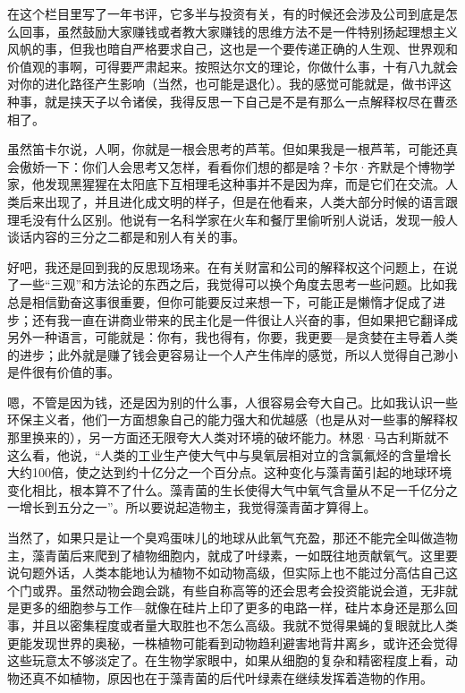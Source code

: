 在这个栏目里写了一年书评，它多半与投资有关，有的时候还会涉及公司到底是怎么回事，虽然鼓励大家赚钱或者教大家赚钱的思维方法不是一件特别扬起理想主义风帆的事，但我也暗自严格要求自己，这也是一个要传递正确的人生观、世界观和价值观的事啊，可得要严肃起来。按照达尔文的理论，你做什么事，十有八九就会对你的进化路径产生影响（当然，也可能是退化）。我的感觉可能就是，做书评这种事，就是挟天子以令诸侯，我得反思一下自己是不是有那么一点解释权尽在曹丞相了。

虽然笛卡尔说，人啊，你就是一根会思考的芦苇。但如果我是一根芦苇，可能还真会傲娇一下：你们人会思考又怎样，看看你们想的都是啥？卡尔·齐默是个博物学家，他发现黑猩猩在太阳底下互相理毛这种事并不是因为痒，而是它们在交流。人类后来出现了，并且进化成文明的样子，但是在他看来，人类大部分时候的语言跟理毛没有什么区别。他说有一名科学家在火车和餐厅里偷听别人说话，发现一般人谈话内容的三分之二都是和别人有关的事。

好吧，我还是回到我的反思现场来。在有关财富和公司的解释权这个问题上，在说了一些``三观''和方法论的东西之后，我觉得可以换个角度去思考一些问题。比如我总是相信勤奋这事很重要，但你可能要反过来想一下，可能正是懒惰才促成了进步；还有我一直在讲商业带来的民主化是一件很让人兴奋的事，但如果把它翻译成另外一种语言，可能就是：你有，我也得有，你要，我更要---是贪婪在主导着人类的进步；此外就是赚了钱会更容易让一个人产生伟岸的感觉，所以人觉得自己渺小是件很有价值的事。

嗯，不管是因为钱，还是因为别的什么事，人很容易会夸大自己。比如我认识一些环保主义者，他们一方面想象自己的能力强大和优越感（也是从对一些事的解释权那里换来的），另一方面还无限夸大人类对环境的破坏能力。林恩·马古利斯就不这么看，他说，``人类的工业生产使大气中与臭氧层相对立的含氯氟烃的含量增长大约100倍，使之达到约十亿分之一个百分点。这种变化与藻青菌引起的地球环境变化相比，根本算不了什么。藻青菌的生长使得大气中氧气含量从不足一千亿分之一增长到五分之一''。所以要说起造物主，我觉得藻青菌才算得上。

当然了，如果只是让一个臭鸡蛋味儿的地球从此氧气充盈，那还不能完全叫做造物主，藻青菌后来爬到了植物细胞内，就成了叶绿素，一如既往地贡献氧气。这里要说句题外话，人类本能地认为植物不如动物高级，但实际上也不能过分高估自己这个门或界。虽然动物会跑会跳，有些自称高等的还会思考会投资能说会道，无非就是更多的细胞参与工作---就像在硅片上印了更多的电路一样，硅片本身还是那么回事，并且以密集程度或者量大取胜也不怎么高级。我就不觉得果蝇的复眼就比人类更能发现世界的奥秘，一株植物可能看到动物趋利避害地背井离乡，或许还会觉得这些玩意太不够淡定了。在生物学家眼中，如果从细胞的复杂和精密程度上看，动物还真不如植物，原因也在于藻青菌的后代叶绿素在继续发挥着造物的作用。

